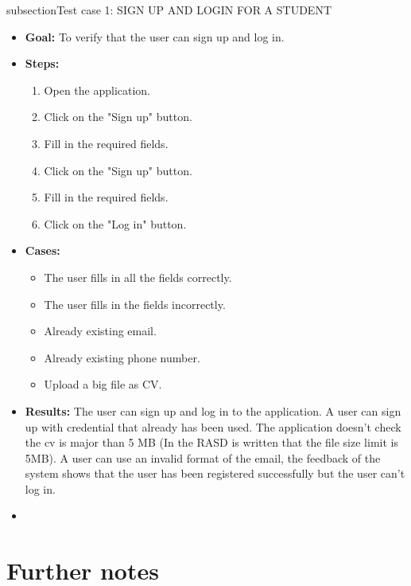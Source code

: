 subsection{Test case 1: SIGN UP AND LOGIN FOR A STUDENT}
\begin{itemize}
    \item \textbf{Goal:} To verify that the user can sign up and log in.

    \item \textbf{Steps:}
    \begin{enumerate}
        \item Open the application.
        \item Click on the "Sign up" button.
        \item Fill in the required fields.
        \item Click on the "Sign up" button.
        \item  Fill in the required fields.
        \item Click on the "Log in" button.
    \end{enumerate}
    \item \textbf{Cases:}
    \begin{itemize}
        \item The user fills in all the fields correctly.
        \item The user fills in the fields incorrectly.
        \item Already existing email.
        \item Already existing phone number.
        \item Upload a big file as CV.
    \end{itemize}
    \item \textbf{Results:} The user can sign up and log in to the application.
    A user can sign up with credential that already has been used.
    The application doesn't check the cv is major than 5 MB (In the RASD is written that the file size limit is 5MB).
    A user can use an invalid format of the email, the feedback of the system shows that the user has been registered successfully but the user can't log in.
    \item
    \end{itemize}
\section{Further notes}

